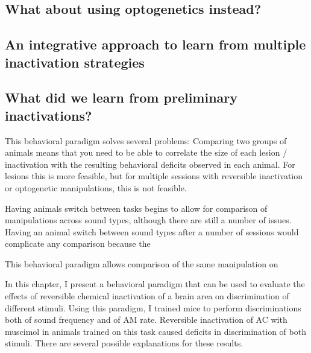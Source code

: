 \subsection{What about using optogenetics instead?}

\subsection{An integrative approach to learn from multiple inactivation strategies}


\subsection{What did we learn from preliminary inactivations?}


This behavioral paradigm solves several problems: 
%
Comparing two groups of animals means that you need to be able to correlate the size of each lesion / inactivation with the resulting behavioral deficits observed in each animal. 
%
For lesions this is more feasible, but for multiple sessions with reversible inactivation or optogenetic manipulations, this is not feasible. 
%

Having animals switch between tasks begins to allow for comparison of manipulations across sound types, although there are still a number of issues. 
%
Having an animal switch between sound types after a number of sessions would complicate any comparison because the 


This behavioral paradigm allows comparison of the same manipulation on 





In this chapter, I present a behavioral paradigm that can be used to evaluate
the effects of reversible chemical inactivation of a brain area on
discrimination of different stimuli. 
%
Using this paradigm, I trained mice to perform discriminations both of sound
frequency and of AM rate.
%
Reversible inactivation of AC with muscimol in animals trained on this task
caused deficits in discrimination of both stimuli. 
%
There are several possible explanations for these results. 

